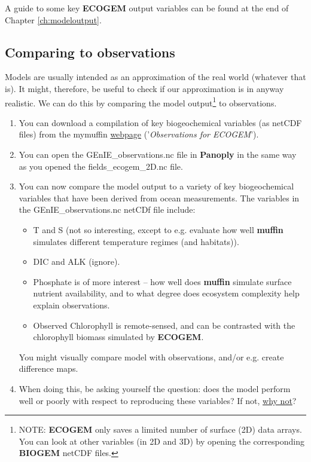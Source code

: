 \documentclass[11pt,fleqn]{book} %
\begin{document}
A guide to some key \textbf{ECOGEM} output variables  can be found at the end of Chapter \ref{ch:modeloutput}.


\subsection{Comparing to observations}

Models are usually intended as an approximation of the real world (whatever that is). It might, therefore, be useful to check if our approximation is in anyway realistic. We can do this by comparing the model output\footnote{NOTE: \textbf{ECOGEM} only saves a limited number of surface (2D) data arrays. You can look at other variables (in 2D and 3D) by opening the corresponding \textbf{BIOGEM} netCDF files.} to observations.

\begin{enumerate}[noitemsep]
\vspace{1mm}
\item You can download a compilation of key biogeochemical variables (as netCDF files) from the \textsf{\footnotesize mymuffin} \href{http://www.seao2.info/cgenie/data/GEnIE_observations.nc}{webpage} ('\textit{Observations for ECOGEM}').
\vspace{1mm}
\item You can open the \textsf{\footnotesize GEnIE\_observations.nc} file in \textbf{Panoply} in the same way as you opened the \textsf{\footnotesize fields\_ecogem\_2D.nc} file.
\vspace{1mm}
\item You can now compare the model output to a variety of key biogeochemical variables that have been derived from ocean measurements. The variables in the \textsf{\footnotesize GEnIE\_observations.nc} netCDf file include:
\begin{itemize}[noitemsep]
\item T and S (not so interesting, except to e.g. evaluate how well \textbf{muffin} simulates different temperature regimes (and habitats)). 
\item DIC and ALK (ignore).
\item Phosphate is of more interest -- how well does \textbf{muffin} simulate surface nutrient availability, and to what degree does ecosystem complexity help explain observations. 
\item Observed Chlorophyll is remote-sensed, and can be contrasted with the chlorophyll biomass simulated by \textbf{ECOGEM}.
\end{itemize}
You might visually compare model with observations, and/or e.g. create difference maps.
\vspace{1mm}
\item When doing this, be asking yourself the question: does the model perform well or poorly with respect to reproducing these variables? If not, \uline{why not}?
\end{enumerate}
\vspace{2mm}
\end{document}
